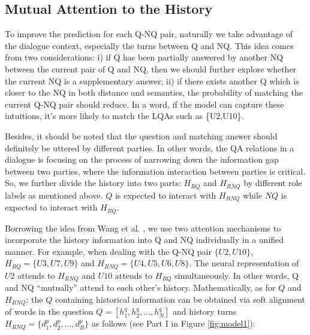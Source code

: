 


\subsection{Mutual Attention to the History}
\label{sec:mutual attention}
To improve the prediction for each Q-NQ pair, 
naturally we take advantage of the dialogue context, 
especially the turns between Q and NQ. 
This idea comes from two considerations: i) if Q has been partially answered 
by another NQ between the current pair of Q and NQ, then we should further explore 
whether the current NQ is a supplementary answer; ii) if there exists another Q which is closer 
to the NQ in both distance and semantics, the probability of matching 
the current Q-NQ pair should reduce. In a word, 
if the model can capture these intuitions, it's more likely to match 
the LQAs such as \{U2,U10\}.

Besides, it should be noted that the question and matching answer should
definitely be uttered by different parties. 
In other words, the QA relations in a dialogue is focusing 
on the process of narrowing down the information gap between two parties, 
where the information interaction between parties is critical. 
So, we further divide the history into two parts: 
$H_{RQ}$ and $H_{RNQ}$ by different role labels as mentioned above. 
$Q$ is expected to interact with $H_{RNQ}$ while $NQ$ is expected to interact with $H_{RQ}$.

Borrowing the idea from Wang et al. \cite{wang2017gated}, we use two attention mechanisms to incorporate the history information into Q and NQ individually in a unified manner. For example, when dealing with the Q-NQ pair $\{U2,U10\}$, $H_{RQ}=\{U3,U7,U9\}$ and $H_{RNQ}=\{U4,U5,U6,U8\}$. The neural representation of $U2$ attends to $H_{RNQ}$ and $U10$ attends to $H_{RQ}$ simultaneously.
In other words, Q and NQ ``mutually'' attend to each other's history. Mathematically, as for $Q$ and $H_{RNQ}$: the $Q$ containing historical information can be obtained  via soft alignment of words in the question $Q=[h^q_1,h^q_2,...,h^q_N]$ and history turns $H_{RNQ}=\{d^p_1,d^p_2,...,d^p_B\}$ as follows (see Part I in Figure \ref{fig:model1}):

